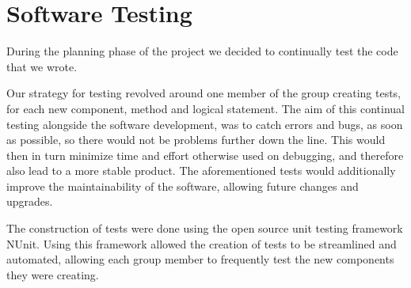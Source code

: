 \section{Software Testing}
During the planning phase of the project we decided to continually test the code that we wrote.

Our strategy for testing revolved around one member of the group creating tests, for each new component, method and logical statement.
The aim of this continual testing alongside the software development, was to catch errors and bugs, as soon as possible, so there would not be problems further down the line.
This would then in turn minimize time and effort otherwise used on debugging, and therefore also lead to a more stable product.
The aforementioned tests would additionally improve the maintainability of the software, allowing future changes and upgrades.

The construction of tests were done using the open source unit testing framework NUnit. 
Using this framework allowed the creation of tests to be streamlined and automated, allowing each group member to frequently test the new components they were creating.

